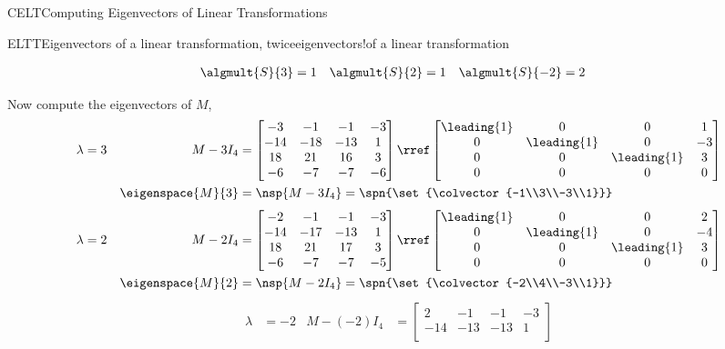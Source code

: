 \begin{subsect}{CELT}{Computing Eigenvectors of Linear Transformations}
\begin{example}{ELTT}{Eigenvectors of a linear transformation, twice}{eigenvectors!of a linear transformation}
\begin{para}
\begin{align*}
\algmult{S}{3}&=1
&
\algmult{S}{2}&=1
&
\algmult{S}{-2}&=2
\end{align*}
\end{para}
%
\begin{para}Now compute the eigenvectors of $M$,
%
\begin{align*}
\lambda&=3&M-3I_4&=
\begin{bmatrix}
 -3 & -1 & -1 & -3 \\
 -14 & -18 & -13 & 1 \\
 18 & 21 & 16 & 3 \\
 -6 & -7 & -7 & -6
\end{bmatrix}
\rref
\begin{bmatrix}
 \leading{1} & 0 & 0 & 1 \\
 0 & \leading{1} & 0 & -3 \\
 0 & 0 & \leading{1} & 3 \\
 0 & 0 & 0 & 0
\end{bmatrix}\\
&&\eigenspace{M}{3}&=\nsp{M-3I_4}
=\spn{\set{\colvector{-1\\3\\-3\\1}}}
\end{align*}
%
\begin{align*}
\lambda&=2&M-2I_4&=
\begin{bmatrix}
 -2 & -1 & -1 & -3 \\
 -14 & -17 & -13 & 1 \\
 18 & 21 & 17 & 3 \\
 -6 & -7 & -7 & -5
\end{bmatrix}
\rref
\begin{bmatrix}
 \leading{1} & 0 & 0 & 2 \\
 0 & \leading{1} & 0 & -4 \\
 0 & 0 & \leading{1} & 3 \\
 0 & 0 & 0 & 0
\end{bmatrix}\\
&&\eigenspace{M}{2}&=\nsp{M-2I_4}
=\spn{\set{\colvector{-2\\4\\-3\\1}}}
\end{align*}
%
\begin{align*}
\lambda&=-2&M-(-2)I_4&=
\begin{bmatrix}
 2 & -1 & -1 & -3 \\
 -14 & -13 & -13 & 1 \\

\end{bmatrix}
\end{align*}
\end{para}
\end{example}
\end{subsect}
